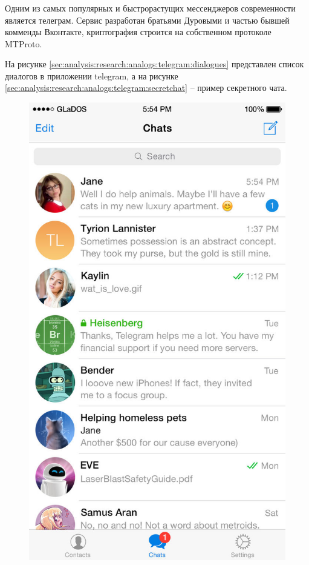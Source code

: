 \subsubsection{}
\label{sec:analysis:research:analogs:telegram}

Одним из самых популярных и быстрорастущих мессенджеров современности является телеграм. 
Сервис разработан братьями Дуровыми и частью бывшей комменды Вконтакте, криптография строится на собственном протоколе MTProto.

На рисунке \ref{sec:analysis:research:analogs:telegram:dialogues} представлен список диалогов в приложении telegram, а на рисунке \ref{sec:analysis:research:analogs:telegram:secretchat} -- пример секретного чата.

\begin{figure}[h]
\centering
\begin{minipage}{.5\textwidth}
  \centering
  \includegraphics[width=.8\linewidth]{inc/img/tg-dialogues.jpg}

\end{minipage}
\end{figure}
